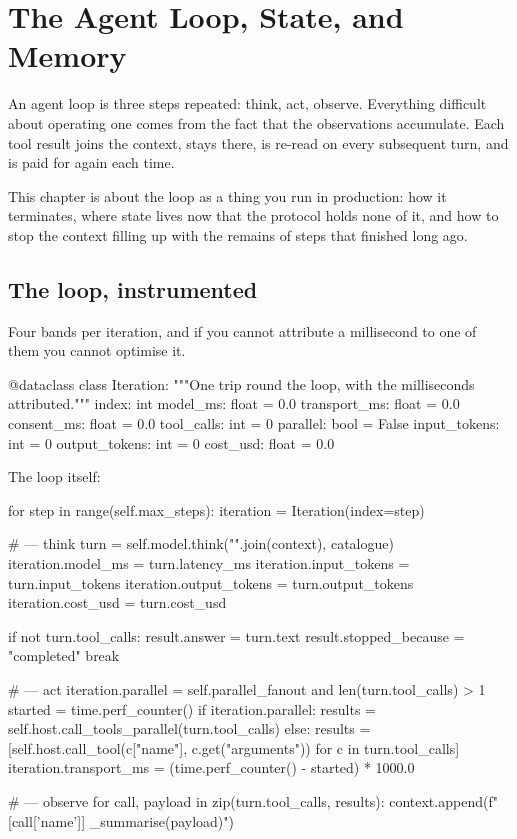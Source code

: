 \chapter{The Agent Loop, State, and Memory}
\label{ch:agent-loop}

An agent loop is three steps repeated: think, act, observe. Everything difficult
about operating one comes from the fact that the observations accumulate. Each
tool result joins the context, stays there, is re-read on every subsequent turn,
and is paid for again each time.

This chapter is about the loop as a thing you run in production: how it
terminates, where state lives now that the protocol holds none of it, and how to
stop the context filling up with the remains of steps that finished long ago.

\section{The loop, instrumented}

Four bands per iteration, and if you cannot attribute a millisecond to one of
them you cannot optimise it.

\begin{py}
@dataclass
class Iteration:
    """One trip round the loop, with the milliseconds attributed."""
    index: int
    model_ms: float = 0.0
    transport_ms: float = 0.0
    consent_ms: float = 0.0
    tool_calls: int = 0
    parallel: bool = False
    input_tokens: int = 0
    output_tokens: int = 0
    cost_usd: float = 0.0
\end{py}

The loop itself:

\begin{py}
for step in range(self.max_steps):
    iteration = Iteration(index=step)

    # --- think
    turn = self.model.think("\n".join(context), catalogue)
    iteration.model_ms = turn.latency_ms
    iteration.input_tokens = turn.input_tokens
    iteration.output_tokens = turn.output_tokens
    iteration.cost_usd = turn.cost_usd

    if not turn.tool_calls:
        result.answer = turn.text
        result.stopped_because = "completed"
        break

    # --- act
    iteration.parallel = self.parallel_fanout and len(turn.tool_calls) > 1
    started = time.perf_counter()
    if iteration.parallel:
        results = self.host.call_tools_parallel(turn.tool_calls)
    else:
        results = [self.host.call_tool(c["name"], c.get("arguments"))
                   for c in turn.tool_calls]
    iteration.transport_ms = (time.perf_counter() - started) * 1000.0

    # --- observe
    for call, payload in zip(turn.tool_calls, results):
        context.append(f"[{call['name']}] {_summarise(payload)}")
\end{py}

